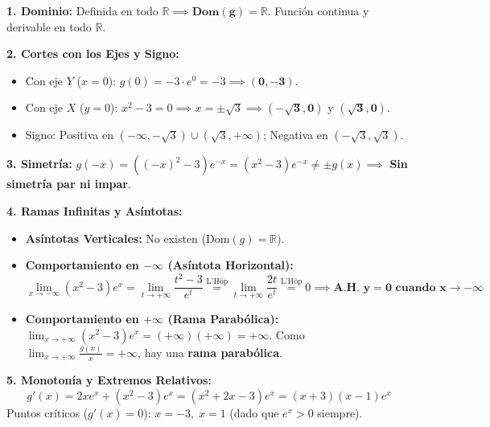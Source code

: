 \documentclass[10pt,a4paper]{article}
\begin{document}
\textbf{1. Dominio:}
Definida en todo $\mathbb{R} \implies \mathbf{\text{Dom}(g) = \mathbb{R}}$. Función continua y derivable en todo $\mathbb{R}$.

\textbf{2. Cortes con los Ejes y Signo:}
\begin{itemize}\itemsep 0pt
    \item Con eje $Y$ ($x = 0$): $g(0) = -3 \cdot e^0 = -3 \implies \mathbf{(0, -3)}$.
    \item Con eje $X$ ($y = 0$): $x^2 - 3 = 0 \implies x = \pm\sqrt{3} \implies \mathbf{(-\sqrt{3}, 0)}$ y $\mathbf{(\sqrt{3}, 0)}$.
    \item Signo: Positiva en $(-\infty, -\sqrt{3}) \cup (\sqrt{3}, +\infty)$; \quad Negativa en $(-\sqrt{3}, \sqrt{3})$.
\end{itemize}

\textbf{3. Simetría:}
$g(-x) = ((-x)^2 - 3)e^{-x} = (x^2 - 3)e^{-x} \neq \pm g(x) \implies$ \textbf{Sin simetría par ni impar}.

\textbf{4. Ramas Infinitas y Asíntotas:}
\begin{itemize}\itemsep 0.5pt
    \item \textbf{Asíntotas Verticales:} No existen ($\text{Dom}(g) = \mathbb{R}$).
    \item \textbf{Comportamiento en $-\infty$ (Asíntota Horizontal):}
    $$\lim_{x \to -\infty} (x^2 - 3)e^x = \lim_{t \to +\infty} \frac{t^2 - 3}{e^t} \stackrel{\text{L'Hôp}}{=} \lim_{t \to +\infty} \frac{2t}{e^t} \stackrel{\text{L'Hôp}}{=} 0 \implies \mathbf{\text{A.H. } y = 0 \text{ cuando } x \to -\infty}$$
    \item \textbf{Comportamiento en $+\infty$ (Rama Parabólica):}
    $\lim_{x \to +\infty} (x^2 - 3)e^x = (+\infty)(+\infty) = +\infty$. Como $\lim_{x \to +\infty} \frac{g(x)}{x} = +\infty$, hay una \textbf{rama parabólica}.
\end{itemize}

\textbf{5. Monotonía y Extremos Relativos:}
$$g'(x) = 2x e^x + (x^2 - 3)e^x = (x^2 + 2x - 3) e^x = (x + 3)(x - 1) e^x$$
Puntos críticos ($g'(x) = 0$): $x = -3, \; x = 1$ (dado que $e^x > 0$ siempre).
\end{document}
